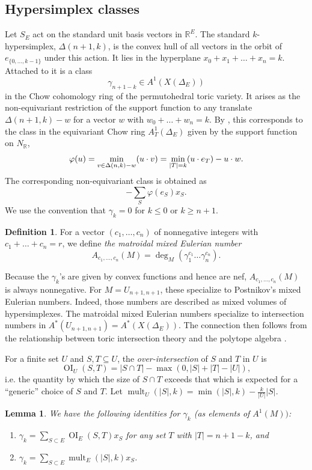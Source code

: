 \documentclass[10pt,a4paper]{amsart}
\numberwithin{equation}{section}
\numberwithin{figure}{section}
\newcommand{\R}{\mathbb{R}}
\newcommand{\RR}{\mathbb{R}}
\DeclareMathOperator{\OI}{OI}
\DeclareMathOperator{\mult}{mult}
\newtheorem{lemma}[theorem]{Lemma}
\theoremstyle{definition}
\newtheorem{defi}[theorem]{Definition}
\theoremstyle{remark}
\begin{document}
\subsection{Hypersimplex classes}

Let $S_{E}$ act on the standard unit basis vectors in $\RR^{E}$. The standard $k$-hypersimplex, $\Delta(n+1,k)$, is the convex hull of all vectors in the orbit of $e_{\{0,\dots,k-1\}}$ under this action. It lies in the hyperplane $x_0+x_1+\dots+x_n=k$. 
Attached to it is a class 
\[\gamma_{n+1-k}\in A^1(X(\Delta_{E}))\]
in the Chow cohomology ring of the permutohedral toric variety. It arises as the non-equivariant restriction of the support function to any translate $\Delta(n+1,k)-w$ for a vector $w$ with $w_0+\dots+w_n=k$. By \cite[Section~6.1]{CoxLittleSchenck}, this corresponds to the class in the equivariant Chow ring $A_T^1(\Delta_{E})$ given by the support function on $N_{\R}$,
\[\varphi(u)=\min_{v\in \Delta(n,k)-w}(u\cdot v)\\
=\min_{|T|=k}(u\cdot e_T)-u\cdot w.
\]
The corresponding non-equivariant class is obtained as
\[-\sum_S \varphi(e_S)x_S.\]
We use the convention that $\gamma_k=0$ for $k\leq 0$ or $k\geq n+1$.

\begin{defi}
For a vector $(c_1,\dots,c_n)$ of nonnegative integers with $c_1+\dots+c_n=r$, we define {\em the matroidal mixed Eulerian number}
\[A_{c_1,\dots,c_n}(M)=\deg_M(\gamma_1^{c_1}\dots\gamma_n^{c_n}).\]
\end{defi}

Because the $\gamma_k$'s are given by convex functions and hence are nef, $A_{c_1,\dots,c_n}(M)$ is always nonnegative. For $M=U_{n+1,n+1}$, these specialize to Postnikov's mixed Eulerian numbers. Indeed, those numbers are described as mixed volumes of hypersimplexes. The matroidal mixed Eulerian numbers specialize to intersection numbers in $A^*(U_{n+1,n+1})=A^*(X(\Delta_{E}))$. The connection then follows from the relationship between toric intersection theory and the polytope algebra \cite{FultonSturmfels}.

For a finite set $U$ and
$S,T\subseteq U$, the {\em over-intersection} of $S$ and $T$ in $U$ is
\[\OI_{U}(S,T)=|S\cap T|-\max(0,|S|+|T|-|U|),\]
i.e. the quantity by which the size of $S\cap T$ exceeds that which is expected for a ``generic'' choice of $S$ and $T$.
Let $\mult_{U}(|S|,k)=\min(|S|,k)-\frac{k}{|U|}|S|$.

\begin{lemma} \label{l:weights} We have the following identities for $\gamma_k$ (as elements of $A^1(M))$:
\begin{enumerate}
    \item $\gamma_k=\sum_{S\subset E} \OI_{E}(S,T)x_S$ for any set $T$ with $|T|=n+1-k$, and
    \item $\gamma_k=\sum_{S\subset E} \mult_{E}(|S|,k) x_S$.
\end{enumerate}
\end{lemma}
\end{document}
